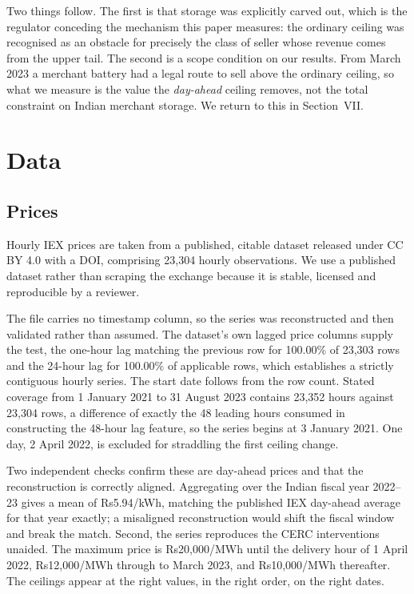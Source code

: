 \documentclass[conference,a4paper]{IEEEtran}
\begin{document}
Two things follow. The first is that storage was explicitly carved out, which is
the regulator conceding the mechanism this paper measures: the ordinary ceiling
was recognised as an obstacle for precisely the class of seller whose revenue
comes from the upper tail. The second is a scope condition on our results. From
March 2023 a merchant battery had a legal route to sell above the ordinary
ceiling, so what we measure is the value the \emph{day-ahead} ceiling removes,
not the total constraint on Indian merchant storage. We return to this in
Section~VII.

\section{Data}

\subsection{Prices}

Hourly IEX prices are taken from a published, citable dataset
\cite{veeramsetty2024} released under CC BY 4.0 with a DOI, comprising 23,304
hourly observations. We use a published dataset rather than scraping the exchange
because it is stable, licensed and reproducible by a reviewer.

The file carries no timestamp column, so the series was reconstructed and then
validated rather than assumed. The dataset's own lagged price columns supply the
test, the one-hour lag matching the previous row for 100.00\% of 23,303 rows and
the 24-hour lag for 100.00\% of applicable rows, which establishes a strictly
contiguous hourly series. The start date follows from the row count. Stated
coverage from 1 January 2021 to 31 August 2023 contains 23,352 hours against
23,304 rows, a difference of exactly the 48 leading hours consumed in
constructing the 48-hour lag feature, so the series begins at 3 January 2021.
One day, 2 April 2022, is excluded for straddling the first ceiling change.

Two independent checks confirm these are day-ahead prices and that the
reconstruction is correctly aligned. Aggregating over the Indian fiscal year
2022--23 gives a mean of Rs5.94/kWh, matching the published IEX day-ahead average
for that year exactly; a misaligned reconstruction would shift the fiscal window
and break the match. Second, the series reproduces the CERC interventions
unaided. The maximum price is Rs20,000/MWh until the delivery hour of
1 April 2022, Rs12,000/MWh through to March 2023, and Rs10,000/MWh thereafter.
The ceilings appear at the right values, in the right order, on the right dates.
\end{document}
